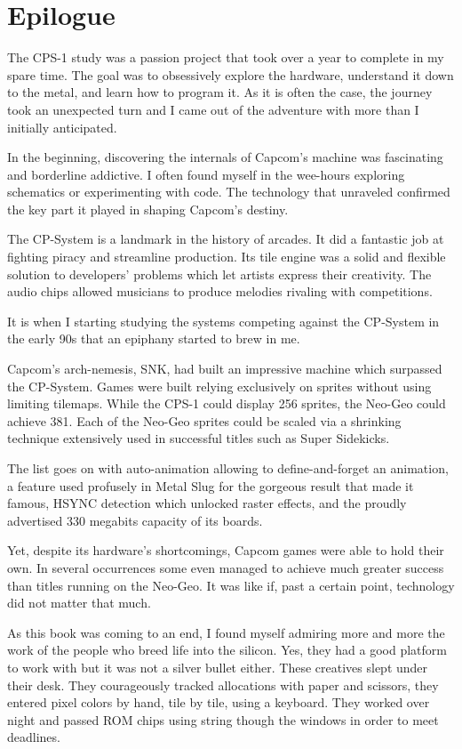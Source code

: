 \chapter{Epilogue} 

The CPS-1 study was a passion project that took over a year to complete in my spare time. The goal was to obsessively explore the hardware, understand it down to the metal, and learn how to program it. As it is often the case, the journey took an unexpected turn and I came out of the adventure with more than I initially anticipated.

In the beginning, discovering the internals of Capcom's machine was fascinating and borderline addictive. I often found myself in the wee-hours exploring schematics or experimenting with code. The technology that unraveled confirmed the key part it played in shaping Capcom's destiny. 

The CP-System is a landmark in the history of arcades. It did a fantastic job at fighting piracy and streamline production. Its tile engine was a solid and flexible solution to developers' problems which let artists express their creativity. The audio chips allowed musicians to produce melodies rivaling with competitions.

It is when I starting studying the systems competing against the CP-System in the early 90s that an epiphany started to brew in me. 

Capcom's arch-nemesis, SNK, had built an impressive machine which surpassed the CP-System. Games were built relying exclusively on sprites without using limiting tilemaps. While the CPS-1 could display 256 sprites, the Neo-Geo could achieve 381. Each of the Neo-Geo sprites could be scaled via a shrinking technique extensively used in successful titles such as Super Sidekicks. 

The list goes on with auto-animation allowing to define-and-forget an animation, a feature used profusely in Metal Slug for the gorgeous result that made it famous, HSYNC detection which unlocked raster effects, and the proudly advertised 330 megabits capacity of its boards.

Yet, despite its hardware's shortcomings, Capcom games were able to hold their own. In several occurrences some even managed to achieve much greater success than titles running on the Neo-Geo. It was like if, past a certain point, technology did not matter that much.

As this book was coming to an end, I found myself admiring more and more the work of the people who breed life into the silicon. Yes, they had a good platform to work with but it was not a silver bullet either. These creatives slept under their desk. They courageously tracked allocations with paper and scissors, they entered pixel colors by hand, tile by tile, using a keyboard. They worked over night and passed ROM chips using string though the windows in order to meet deadlines.

